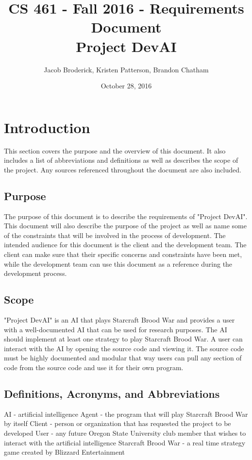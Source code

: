 \documentclass[10pt,letterpaper,onecolumn,draftclsnofoot]{IEEEtran}
\begin{document}
\begin{titlepage}

  \title{CS 461 - Fall 2016 - Requirements Document \\ Project DevAI}
  \author{Jacob Broderick, Kristen Patterson, Brandon Chatham}
  \date{October 28, 2016}
  \maketitle
  \vspace{4cm}

\end{titlepage}

\tableofcontents
\newpage

\section{Introduction}
This section covers the purpose and the overview of this document. It also includes a list of abbreviations and definitions as well as describes the scope of the project. Any sources referenced throughout the document are also included.

\subsection{Purpose}
The purpose of this document is to describe the requirements of "Project DevAI". This document will also describe the purpose of the project as well as name some of the constraints that will be involved in the process of development. The intended audience for this document is the client and the development team. The client can make sure that their specific concerns and constraints have been met, while the development team can use this document as a reference during the development process.

\subsection{Scope}
"Project DevAI" is an AI that plays Starcraft Brood War and provides a user with a well-documented AI that can be used for research purposes. The AI should implement at least one strategy to play Starcraft Brood War. A user can interact with the AI by opening the source code and viewing it. The source code must be highly documented and modular that way users can pull any section of code from the source code and use it for their own program.

\subsection{Definitions, Acronyms, and Abbreviations}
AI - artificial intelligence
Agent - the program that will play Starcraft Brood War by itself
Client - person or organization that has requested the project to be developed
User - any future Oregon State University club member that wishes to interact with the artificial intelligence
Starcraft Brood War - a real time strategy game created by Blizzard Entertainment
\end{document}
